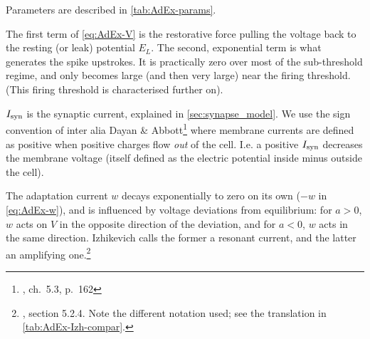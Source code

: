 Parameters are described in \cref{tab:AdEx-params}.

The first term of \cref{eq:AdEx-V} is the restorative force pulling the voltage back to the resting (or leak) potential $E_L$. The second, exponential term is what generates the spike upstrokes. It is practically zero over most of the sub-threshold regime, and only becomes large (and then very large) near the firing threshold. (This firing threshold is characterised further on).

$I_{\text{syn}}$ is the synaptic current, explained in \cref{sec:synapse_model}.
We use the sign convention of inter alia Dayan \& Abbott\footnote{\cite{Dayan2001TheoreticalNeuroscienceComputational}, ch.~5.3, p.~162} where membrane currents are defined as positive when positive charges flow \emph{out} of the cell. I.e. a positive $I_{\text{syn}}$ decreases the membrane voltage (itself defined as the electric potential inside minus outside the cell).

The adaptation current $w$ decays exponentially to zero on its own ($-w$ in \cref{eq:AdEx-w}), and is influenced by voltage deviations from equilibrium: for $a > 0$, $w$ acts on $V$ in the opposite direction of the deviation, and for $a < 0$, $w$ acts in the same direction. Izhikevich calls the former a resonant current, and the latter an amplifying one.\footnote{\cite{Izhikevich2007DynamicalSystemsNeuroscience}, section 5.2.4. Note the different notation used; see the translation in \cref{tab:AdEx-Izh-compar}.}

